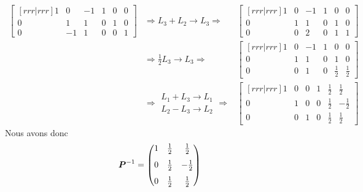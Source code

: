 \[
\begin{matrix}
\begin{bmatrix}[rrr|rrr]
1 & 0 & -1 & 1 & 0 & 0\\
0 & 1 & 1 & 0 & 1 & 0\\
0 & -1 & 1 & 0 & 0 & 1
\end{bmatrix}
&\Rightarrow L_3 + L_2 \rightarrow L_3 \Rightarrow&
\begin{bmatrix}[rrr|rrr]
1 & 0 & -1 & 1 & 0 & 0\\
0 & 1 & 1 & 0 & 1 & 0\\
0 & 0 & 2 & 0 & 1 & 1
\end{bmatrix} \\[10pt]
&\Rightarrow \frac12 L_3  \rightarrow L_3 \Rightarrow&
\begin{bmatrix}[rrr|rrr]
1 & 0 & -1 & 1 & 0 & 0\\
0 & 1 & 1 & 0 & 1 & 0\\
0 & 0 & 1 & 0 &\frac12 & \frac12
\end{bmatrix} \\[10pt]
&\Rightarrow \begin{matrix}
 L_1 + L_3  \rightarrow L_1 \\
  L_2 - L_3  \rightarrow L_2
\end{matrix}  \Rightarrow&
\begin{bmatrix}[rrr|rrr]
1 & 0 & 0 & 1 & \frac12 & \frac12\\[7pt]
0 & 1 & 0 & 0 & \frac12 & -\frac12\\[7pt]
0 & 0 & 1 & 0 &\frac12 & \frac12
\end{bmatrix}
\end{matrix}
\]
Nous avons donc
\[
\boldsymbol{P}^{-1} = \begin{pmatrix}
 1 & \frac12 & \frac12\\[7pt]
 0 & \frac12 & -\frac12\\[7pt]
0 &\frac12 & \frac12
\end{pmatrix}
\]

